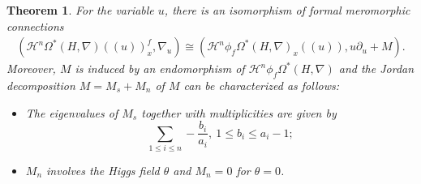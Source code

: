 \documentclass[12pt, a4paper]{article}
\newtheorem{theorem}{Theorem}[section]
\begin{document}
\begin{theorem}\label{log monodromy}
For the variable $u$, there is an isomorphism of formal meromorphic connections
\begin{eqnarray}\label{Jordan decomposition}
(\mathcal H^n\Omega^*(H,\nabla)((u))_x^f,\nabla_u)\cong(\mathcal H^n\phi_f\Omega^*(H,\nabla)_x((u)),u\partial_u+M).
\end{eqnarray}
Moreover, $M$ is induced by an endomorphism of $\mathcal H^n\phi_f\Omega^*(H,\nabla)$ and the Jordan decomposition $M=M_s+M_n$ of $M$ can be characterized as follows:
\begin{itemize}
\item The  eigenvalues of  $M_s$  together with multiplicities are given by
$$
\sum_{1\leq i\leq n}-\frac{b_i}{a_i},~1\leq b_i\leq a_i-1;
$$
\item $M_n$ involves the Higgs field $\theta$ and $M_n=0$ for $\theta=0$.
\end{itemize}
\end{theorem}
\end{document}
